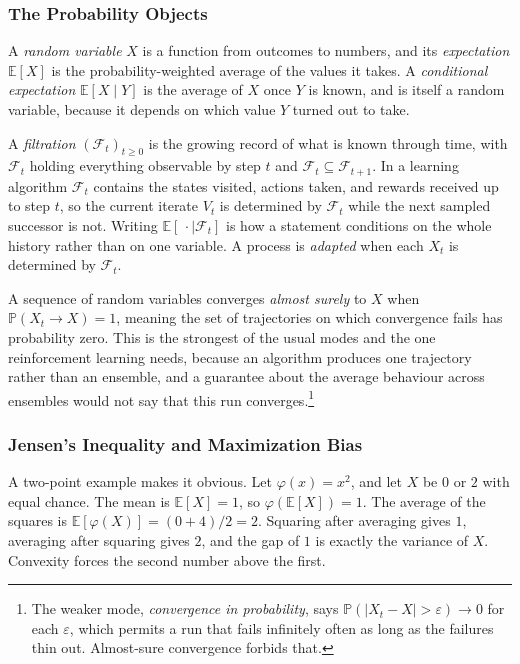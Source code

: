 \subsubsection{The Probability Objects}

A \emph{random variable} $X$ is a function from outcomes to numbers, and its \emph{expectation} $\mathbb{E}[X]$ is the probability-weighted average of the values it takes. A \emph{conditional expectation} $\mathbb{E}[X \mid Y]$ is the average of $X$ once $Y$ is known, and is itself a random variable, because it depends on which value $Y$ turned out to take.

A \emph{filtration} $(\mathcal{F}_t)_{t \geq 0}$ is the growing record of what is known through time, with $\mathcal{F}_t$ holding everything observable by step $t$ and $\mathcal{F}_t \subseteq \mathcal{F}_{t+1}$. In a learning algorithm $\mathcal{F}_t$ contains the states visited, actions taken, and rewards received up to step $t$, so the current iterate $V_t$ is determined by $\mathcal{F}_t$ while the next sampled successor is not. Writing $\mathbb{E}[\,\cdot \mid \mathcal{F}_t]$ is how a statement conditions on the whole history rather than on one variable. A process is \emph{adapted} when each $X_t$ is determined by $\mathcal{F}_t$.

A sequence of random variables converges \emph{almost surely} to $X$ when $\mathbb{P}(X_t \to X) = 1$, meaning the set of trajectories on which convergence fails has probability zero. This is the strongest of the usual modes and the one reinforcement learning needs, because an algorithm produces one trajectory rather than an ensemble, and a guarantee about the average behaviour across ensembles would not say that this run converges.\footnote{The weaker mode, \emph{convergence in probability}, says $\mathbb{P}(|X_t - X| > \varepsilon) \to 0$ for each $\varepsilon$, which permits a run that fails infinitely often as long as the failures thin out. Almost-sure convergence forbids that.}

\subsubsection{Jensen's Inequality and Maximization Bias}

A two-point example makes it obvious. Let $\varphi(x) = x^2$, and let $X$ be $0$ or $2$ with equal chance. The mean is $\mathbb{E}[X] = 1$, so $\varphi(\mathbb{E}[X]) = 1$. The average of the squares is $\mathbb{E}[\varphi(X)] = (0 + 4)/2 = 2$. Squaring after averaging gives $1$, averaging after squaring gives $2$, and the gap of $1$ is exactly the variance of $X$. Convexity forces the second number above the first.

